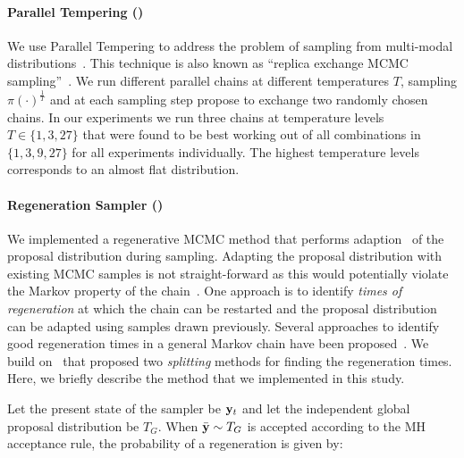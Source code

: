 \paragraph{Parallel Tempering (\PT)}
We use Parallel Tempering to address the problem of sampling from
multi-modal
distributions~\cite{swendsen1986replicamontecarlo,geyer1991paralleltempering}.
This technique is also known as ``replica exchange MCMC
sampling''~\cite{hukushima1996exchange}.
We run different parallel chains at different temperatures $T$, sampling
$\pi(\cdot)^{\frac{1}{T}}$ and at each sampling step propose to exchange two
randomly chosen chains. In our experiments we run three chains at
temperature levels $T\in\{1,3,27\}$ that were found to be best working
out of all combinations in $\{1,3,9,27\}$ for all experiments
individually. The highest temperature levels corresponds to an almost
flat distribution.
%
\paragraph{Regeneration Sampler (\REGAMH)}
We implemented a regenerative MCMC method
\cite{mykland1995regeneration} that performs
adaption~\cite{gilks1998adaptive} of the proposal distribution during
sampling.
Adapting the proposal distribution with existing MCMC samples is not
straight-forward as this would potentially violate the Markov property
of the chain~\cite{atchade2005adaptivemcmc}.
One approach is to identify \textit{times of
  regeneration} at which the chain can be restarted and the proposal
distribution can be adapted using samples drawn previously.
Several approaches to identify good regeneration times in a
general Markov chain have been proposed~\cite{athreya1978new,
  nummelin1978splitting}. We build on~\cite{mykland1995regeneration}
that proposed two \textit{splitting} methods for finding the
regeneration times. Here, we briefly describe the method that we
implemented in this study.

Let the present state of the sampler be $\mathbf{y}_t$ and let the independent
global proposal distribution be $T_G$. When $\bar{\mathbf{y}} \sim T_G$ is accepted
according to the MH acceptance rule, the probability of a regeneration is
given by:

